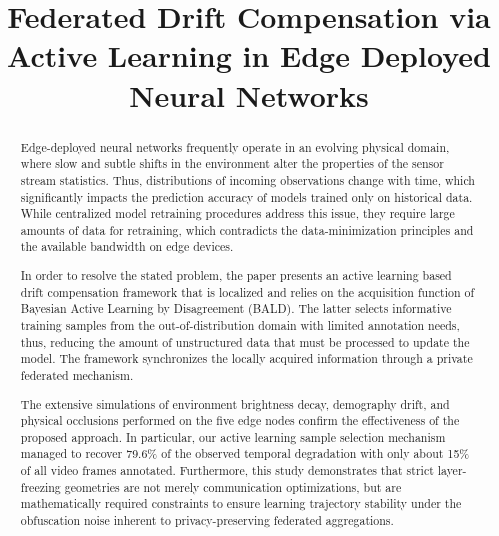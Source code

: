 \documentclass[conference]{IEEEtran}
\begin{document}
\title{Federated Drift Compensation via Active Learning in Edge Deployed Neural Networks}

\author{
}

\maketitle

\begin{abstract}
Edge-deployed neural networks frequently operate in an evolving physical domain, where slow and subtle shifts in the environment alter the properties of the sensor stream statistics. Thus, distributions of incoming observations change with time, which significantly impacts the prediction accuracy of models trained only on historical data. While centralized model retraining procedures address this issue, they require large amounts of data for retraining, which contradicts the data-minimization principles and the available bandwidth on edge devices.

In order to resolve the stated problem, the paper presents an active learning based drift compensation framework that is localized and relies on the acquisition function of Bayesian Active Learning by Disagreement (BALD). The latter selects informative training samples from the out-of-distribution domain with limited annotation needs, thus, reducing the amount of unstructured data that must be processed to update the model. The framework synchronizes the locally acquired information through a private federated mechanism.

The extensive simulations of environment brightness decay, demography drift, and physical occlusions performed on the five edge nodes confirm the effectiveness of the proposed approach. In particular, our active learning sample selection mechanism managed to recover 79.6\% of the observed temporal degradation with only about 15\% of all video frames annotated. Furthermore, this study demonstrates that strict layer-freezing geometries are not merely communication optimizations, but are mathematically required constraints to ensure learning trajectory stability under the obfuscation noise inherent to privacy-preserving federated aggregations.
\end{abstract}
\end{document}
